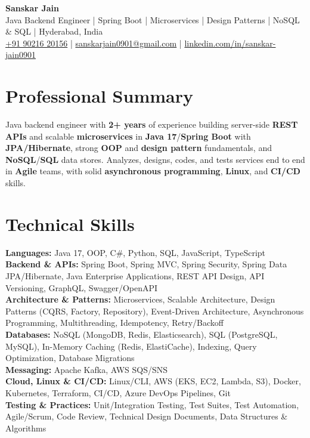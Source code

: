 \documentclass[a4paper,10pt]{article}
\begin{document}
\begin{center}
    {\LARGE \textbf{Sanskar Jain}} \\
    \vspace{2pt}
    Java Backend Engineer \;|\; Spring Boot \;|\; Microservices \;|\; Design Patterns \;|\; NoSQL \& SQL \;|\; Hyderabad, India \\
    \vspace{2pt}
    \href{tel:+919021620156}{+91 90216 20156} \;|\;
    \href{mailto:sanskarjain0901@gmail.com}{sanskarjain0901@gmail.com} \;|\;
    \href{https://www.linkedin.com/in/sanskar-jain0901/}{linkedin.com/in/sanskar-jain0901}
\end{center}

\section*{Professional Summary}
Java backend engineer with \textbf{2+ years} of experience building server-side \textbf{REST APIs} and scalable \textbf{microservices} in \textbf{Java 17}/\textbf{Spring Boot} with \textbf{JPA/Hibernate}, strong \textbf{OOP} and \textbf{design pattern} fundamentals, and \textbf{NoSQL}/\textbf{SQL} data stores.
Analyzes, designs, codes, and tests services end to end in \textbf{Agile} teams, with solid \textbf{asynchronous programming}, \textbf{Linux}, and \textbf{CI/CD} skills.

\section*{Technical Skills}
\begin{sloppypar}
\noindent
\textbf{Languages:} Java 17, OOP, C\#, Python, SQL, JavaScript, TypeScript \\
\textbf{Backend \& APIs:} Spring Boot, Spring MVC, Spring Security, Spring Data JPA/Hibernate, Java Enterprise Applications, REST API Design, API Versioning, GraphQL, Swagger/OpenAPI \\
\textbf{Architecture \& Patterns:} Microservices, Scalable Architecture, Design Patterns (CQRS, Factory, Repository), Event-Driven Architecture, Asynchronous Programming, Multithreading, Idempotency, Retry/Backoff \\
\textbf{Databases:} NoSQL (MongoDB, Redis, Elasticsearch), SQL (PostgreSQL, MySQL), In-Memory Caching (Redis, ElastiCache), Indexing, Query Optimization, Database Migrations \\
\textbf{Messaging:} Apache Kafka, AWS SQS/SNS \\
\textbf{Cloud, Linux \& CI/CD:} Linux/CLI, AWS (EKS, EC2, Lambda, S3), Docker, Kubernetes, Terraform, CI/CD, Azure DevOps Pipelines, Git \\
\textbf{Testing \& Practices:} Unit/Integration Testing, Test Suites, Test Automation, Agile/Scrum, Code Review, Technical Design Documents, Data Structures \& Algorithms
\end{sloppypar}
\end{document}
